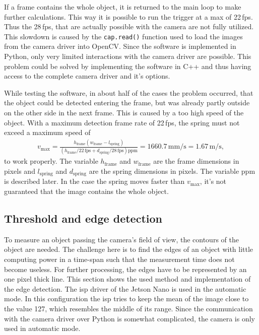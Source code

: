 If a frame contains the whole object, it is returned to the main loop to make further calculations.
This way it is possible to run the trigger at a max of 22\,fps. 
Thus the 28\,fps, that are actually possible with the camera are not fully utilized. 
This slowdown is caused by the \texttt{cap.read()} function used to load the images from the camera driver into OpenCV. 
Since the software is implemented in Python, only very limited interactions with the camera driver are possible. 
This problem could be solved by implementing the software in C++ and thus having access to the complete camera driver and it's options.

While testing the software, in about half of the cases the problem occurred, that the object could be detected entering the frame, but was already partly outside on the other side in the next frame. 
This is caused by a too high speed of the object.
With a maximum detection frame rate of 22\,fps, the spring must not exceed a maximum speed of
\begin{align*}
	v_{\text{max}}= \frac{h_{\text{frame}}(w_{\text{frame}}-l_{\text{spring}})}{(h_{\text{frame}}/22\,\text{fps}+d_{\text{spring}}/28\,\text{fps})\text{ppm} }=1660.7\,\text{mm/s}=1.67\,\text{m/s},	
\end{align*}
to work properly.
The variable $h_\text{frame}$ and $w_{\text{frame}}$ are the frame dimensions in pixels and $l_{\text{spring}}$ and $d_{\text{spring}}$ are the spring dimensions in pixels.
The variable ppm is described later.
In the case the spring moves faster than $v_{\text{max}}$, it's not guaranteed that the image contains the whole object.
\subsection{Threshold and edge detection}
To measure an object passing the camera's field of view, the contours of the object are needed.
The challenge here is to find the edges of an object with little computing power in a time-span such that the measurement time does not become useless.
For further processing, the edges have to be represented by an one pixel thick line.
This section shows the used method and implementation of the edge detection.
The \acs{isp} driver of the Jetson Nano is used in the automatic mode.
In this configuration the \acs{isp} tries to keep the mean of the image close to the value 127, which resembles the middle of its range. Since the communication with the camera driver over Python is somewhat complicated, the camera is only used in automatic mode.

